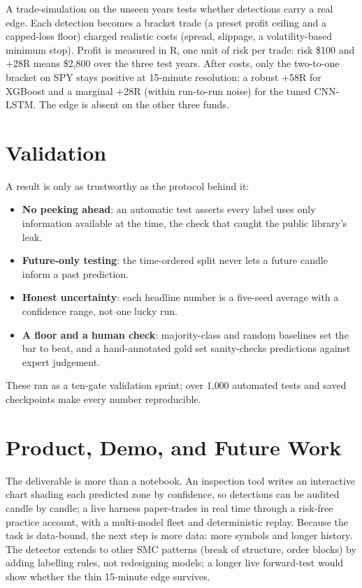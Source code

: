 \documentclass[10pt, twocolumn, letterpaper]{article}
\begin{document}
A trade-simulation on the unseen years tests whether detections carry a real edge. Each detection becomes a bracket trade (a preset profit ceiling and a capped-loss floor) charged realistic costs (spread, slippage, a volatility-based minimum stop). Profit is measured in R, one unit of risk per trade: risk \$100 and +28R means \$2{,}800 over the three test years. After costs, only the two-to-one bracket on SPY stays positive at 15-minute resolution: a robust +58R for XGBoost and a marginal +28R (within run-to-run noise) for the tuned CNN-LSTM. The edge is absent on the other three funds.

\section{Validation}
A result is only as trustworthy as the protocol behind it:
\begin{itemize}
    \item \textbf{No peeking ahead}: an automatic test asserts every label uses only information available at the time, the check that caught the public library's leak.
    \item \textbf{Future-only testing}: the time-ordered split never lets a future candle inform a past prediction.
    \item \textbf{Honest uncertainty}: each headline number is a five-seed average with a confidence range, not one lucky run.
    \item \textbf{A floor and a human check}: majority-class and random baselines set the bar to beat, and a hand-annotated gold set sanity-checks predictions against expert judgement.
\end{itemize}
These ran as a ten-gate validation sprint; over 1{,}000 automated tests and saved checkpoints make every number reproducible.

\section{Product, Demo, and Future Work}
The deliverable is more than a notebook. An inspection tool writes an interactive chart shading each predicted zone by confidence, so detections can be audited candle by candle; a live harness paper-trades in real time through a risk-free practice account, with a multi-model fleet and deterministic replay. Because the task is data-bound, the next step is more data: more symbols and longer history. The detector extends to other SMC patterns (break of structure, order blocks) by adding labelling rules, not redesigning models; a longer live forward-test would show whether the thin 15-minute edge survives.
\end{document}
